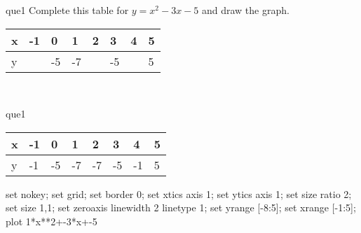 \documentclass[13.5pt, varwidth=true]{beamer}
\begin{document}
\begin{frame}[shrink=19,fragile]
	\begin{beamercolorbox}[rounded=true, left, shadow=true,wd=14.8cm]{que1}
		 Complete this table for $y = x^{2} - 3x - 5$ and draw the graph. \\[0.3cm] \renewcommand{\arraystretch}{1.2}\begin{tabular}{|C|C|C|C|C|C|C|C|} \hline x & -1 & 0 & 1 & 2 & 3 & 4 & 5 \\ \hline y &  & -5 & -7 &  & -5 &  & 5\\ \hline \end{tabular}\\[0.3cm]
	\end{beamercolorbox}
\end{frame}
\begin{frame}[shrink=19,fragile]
	\begin{beamercolorbox}[rounded=true, left, shadow=true,wd=14.8cm]{que1}
		\renewcommand{\arraystretch}{1.2}\begin{tabular}{|C|C|C|C|C|C|C|C|} \hline x & -1 & 0 & 1 & 2 & 3 & 4 & 5 \\ \hline y & -1 & -5 & -7 & -7 & -5 & -1 & 5\\ \hline \end{tabular}\begin{gnuplot}[terminal=pdf] set nokey; set grid; set border 0; set xtics axis 1; set ytics axis 1; set size ratio 2; set size 1,1; set zeroaxis linewidth 2 linetype 1; set yrange [-8:5]; set xrange [-1:5]; plot 1*x**2+-3*x+-5 \end{gnuplot}
	\end{beamercolorbox}
\end{frame}
\end{document}
